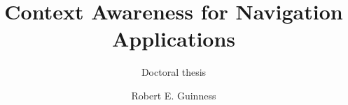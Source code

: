 \author{Robert E. Guinness}
\title{Context Awareness for Navigation Applications}
\subtitle{Doctoral thesis}
\maketitle
% 
% 
% 
% 
% 
% 


%
